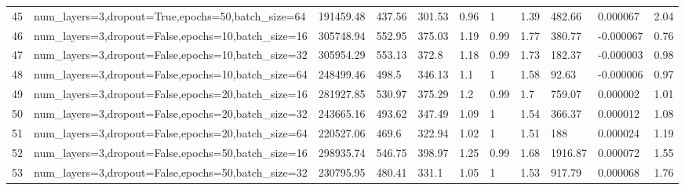 \begin{longtable}{C{0.8cm} L{2cm} C{1.15cm} C{1.15cm} C{1.15cm} C{1.15cm} C{0.85cm} C{1.25cm} C{1.2cm} C{1.5cm} C{1.0cm}}
45 & num\_layers=3,\newline dropout=True,\newline epochs=50,\newline batch\_size=64 & 191459.48 & 437.56 & 301.53 & 0.96 & 1 & 1.39 & 482.66 & 0.000067 & 2.04 \\
46 & num\_layers=3,\newline dropout=False,\newline epochs=10,\newline batch\_size=16 & 305748.94 & 552.95 & 375.03 & 1.19 & 0.99 & 1.77 & 380.77 & -0.000067 & 0.76 \\
47 & num\_layers=3,\newline dropout=False,\newline epochs=10,\newline batch\_size=32 & 305954.29 & 553.13 & 372.8 & 1.18 & 0.99 & 1.73 & 182.37 & -0.000003 & 0.98 \\
48 & num\_layers=3,\newline dropout=False,\newline epochs=10,\newline batch\_size=64 & 248499.46 & 498.5 & 346.13 & 1.1 & 1 & 1.58 & 92.63 & -0.000006 & 0.97 \\
49 & num\_layers=3,\newline dropout=False,\newline epochs=20,\newline batch\_size=16 & 281927.85 & 530.97 & 375.29 & 1.2 & 0.99 & 1.7 & 759.07 & 0.000002 & 1.01 \\
50 & num\_layers=3,\newline dropout=False,\newline epochs=20,\newline batch\_size=32 & 243665.16 & 493.62 & 347.49 & 1.09 & 1 & 1.54 & 366.37 & 0.000012 & 1.08 \\
51 & num\_layers=3,\newline dropout=False,\newline epochs=20,\newline batch\_size=64 & 220527.06 & 469.6 & 322.94 & 1.02 & 1 & 1.51 & 188 & 0.000024 & 1.19 \\
52 & num\_layers=3,\newline dropout=False,\newline epochs=50,\newline batch\_size=16 & 298935.74 & 546.75 & 398.97 & 1.25 & 0.99 & 1.68 & 1916.87 & 0.000072 & 1.55 \\
53 & num\_layers=3,\newline dropout=False,\newline epochs=50,\newline batch\_size=32 & 230795.95 & 480.41 & 331.1 & 1.05 & 1 & 1.53 & 917.79 & 0.000068 & 1.76 \\

\end{longtable}

